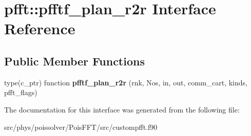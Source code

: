 \hypertarget{interfacepfft_1_1pfftf__plan__r2r}{}\section{pfft\+:\+:pfftf\+\_\+plan\+\_\+r2r Interface Reference}
\label{interfacepfft_1_1pfftf__plan__r2r}
\subsection*{Public Member Functions}
\begin{DoxyCompactItemize}
\item 
type(c\+\_\+ptr) function {\bfseries pfftf\+\_\+plan\+\_\+r2r} (rnk, Nos, in, out, comm\+\_\+cart, kinds, pfft\+\_\+flags)\hypertarget{interfacepfft_1_1pfftf__plan__r2r_acd2ccac54aac6a6b3b5a3362184a6087}{}\label{interfacepfft_1_1pfftf__plan__r2r_acd2ccac54aac6a6b3b5a3362184a6087}

\end{DoxyCompactItemize}


The documentation for this interface was generated from the following file\+:\begin{DoxyCompactItemize}
\item 
src/phys/poissolver/\+Pois\+F\+F\+T/src/custompfft.\+f90\end{DoxyCompactItemize}
